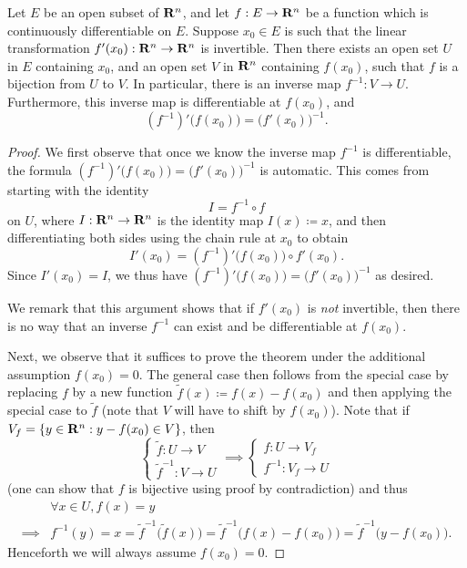 \begin{theorem}\label{6.7.2}
    Let \(E\) be an open subset of \(\mathbf{R}^n\), and let \(f : E \to \mathbf{R}^n\) be a function which is continuously differentiable on \(E\).
    Suppose \(x_0 \in E\) is such that the linear transformation \(f'(x_0) : \mathbf{R}^n \to \mathbf{R}^n\) is invertible.
    Then there exists an open set \(U\) in \(E\) containing \(x_0\), and an open set \(V\) in \(\mathbf{R}^n\) containing \(f(x_0)\), such that \(f\) is a bijection from \(U\) to \(V\).
    In particular, there is an inverse map \(f^{-1} : V \to U\).
    Furthermore, this inverse map is differentiable at \(f(x_0)\), and
    \[
        (f^{-1})' \big(f(x_0)\big) = \big(f'(x_0)\big)^{-1}.
    \]
\end{theorem}

\begin{proof}
    We first observe that once we know the inverse map \(f^{-1}\) is differentiable, the formula \((f^{-1})' \big(f(x_0)\big) = \big(f'(x_0)\big)^{-1}\) is automatic.
    This comes from starting with the identity
    \[
        I = f^{-1} \circ f
    \]
    on \(U\), where \(I : \mathbf{R}^n \to \mathbf{R}^n\) is the identity map \(I(x) \coloneqq x\), and then differentiating both sides using the chain rule at \(x_0\) to obtain
    \[
        I'(x_0) = (f^{-1})' \big(f(x_0)\big) \circ f'(x_0).
    \]
    Since \(I'(x_0) = I\), we thus have \((f^{-1})' \big(f(x_0)\big) = \big(f'(x_0)\big)^{-1}\) as desired.

    We remark that this argument shows that if \(f'(x_0)\) is \emph{not} invertible, then there is no way that an inverse \(f^{-1}\) can exist and be differentiable at \(f(x_0)\).

    Next, we observe that it suffices to prove the theorem under the additional assumption \(f(x_0) = 0\).
    The general case then follows from the special case by replacing \(f\) by a new function \(\tilde{f}(x) \coloneqq f(x) - f(x_0)\) and then applying the special case to \(\tilde{f}\)
    (note that \(V\) will have to shift by \(f(x_0)\)).
    Note that if \(V_f = \{y \in \mathbf{R}^n : y - f(x_0) \in V\}\), then
    \[
        \begin{cases}
            \tilde{f} : U \to V \\
            \tilde{f}^{-1} : V \to U
        \end{cases} \implies \begin{cases}
            f : U \to V_f \\
            f^{-1} : V_f \to U
        \end{cases}
    \]
    (one can show that \(f\) is bijective using proof by contradiction)
    and thus
    \begin{align*}
                 & \forall x \in U, f(x) = y                                                                                                          \\
        \implies & f^{-1}(y) = x = \tilde{f}^{-1}\big(\tilde{f}(x)\big) = \tilde{f}^{-1}\big(f(x) - f(x_0)\big) = \tilde{f}^{-1}\big(y - f(x_0)\big).
    \end{align*}
    Henceforth we will always assume \(f(x_0) = 0\).


\end{proof}
